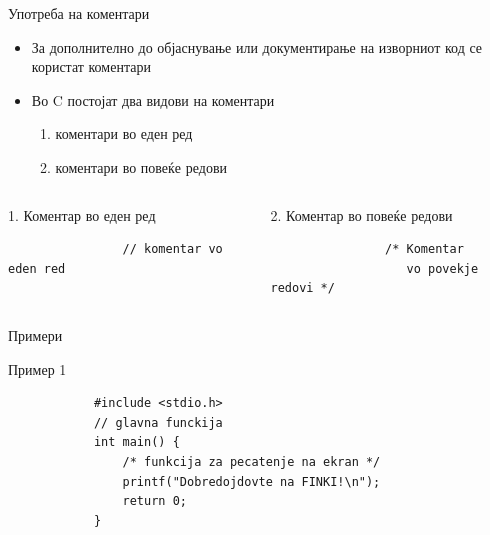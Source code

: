 \begin{frame}[fragile]{Употреба на коментари}
	\begin{itemize}
		\item За дополнително до објаснување или документирање на изворниот код се користат коментари
		\item Во C постојат два видови на коментари
		\begin{enumerate}
			\item коментари во еден ред
			\item коментари во повеќе редови
		\end{enumerate}	
		
	\end{itemize}
		
	\begin{columns}[t]
			\begin{block}{1. Коментар во еден ред}
				\begin{verbatim}
				// komentar vo eden red
				\end{verbatim}
			\end{block}
			\begin{block}{2. Коментар во повеќе редови}
				\begin{verbatim}
				/* Komentar 
				   vo povekje redovi */
				\end{verbatim}
			\end{block}
	\end{columns}		

\end{frame}

\begin{frame}[fragile]{Примери}
	\begin{exampleblock}{Пример 1}
		\begin{lstlisting}
			#include <stdio.h>
			// glavna funckija
			int main() {
			    /* funkcija za pecatenje na ekran */
			    printf("Dobredojdovte na FINKI!\n");
			    return 0;
			}
		\end{lstlisting}
	\end{exampleblock}
\end{frame}

